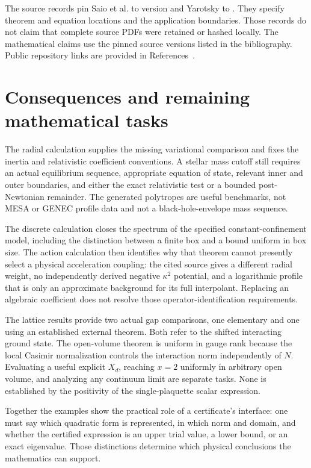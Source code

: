 \documentclass[11pt,letterpaper]{article}
\theoremstyle{definition}
\numberwithin{equation}{section}
\begin{document}
The source records pin Saio et al. to version  and
Yarotsky to . They specify theorem and equation
locations and the application boundaries. Those
records do not claim that complete source PDFs were retained or hashed
locally. The mathematical claims use the pinned source versions listed
in the bibliography. Public repository links are provided in
References~\cite{archive,leanrepo,sources}.

\section{Consequences and remaining mathematical tasks}

The radial calculation supplies the missing variational comparison and
fixes the inertia and relativistic coefficient conventions. A stellar
mass cutoff still requires an actual equilibrium sequence, appropriate
equation of state, relevant inner and outer boundaries, and either the
exact relativistic test or a bounded post-Newtonian remainder. The
generated polytropes are useful benchmarks, not MESA or GENEC profile
data and not a black-hole-envelope mass sequence.

The discrete calculation closes the spectrum of the specified
constant-confinement model, including the distinction between a finite
box and a bound uniform in box size. The action calculation then identifies
why that theorem cannot presently select a physical acceleration
coupling: the cited source gives a different radial weight, no independently
derived negative $\kappa^2$ potential, and a logarithmic profile that is
only an approximate background for its full interpolant. Replacing an
algebraic coefficient does not resolve those operator-identification
requirements.

The lattice results provide two actual gap comparisons, one elementary
and one using an established external theorem. Both refer to the shifted
interacting ground state. The open-volume theorem is uniform in gauge
rank because the local Casimir normalization controls the interaction
norm independently of $N$. Evaluating a useful explicit $X_d$, reaching
$x=2$ uniformly in arbitrary open volume, and analyzing any continuum
limit are separate tasks. None is established by the positivity of the
single-plaquette scalar expression.

Together the examples show the practical role of a certificate's
interface: one must say which quadratic form is represented, in which
norm and domain, and whether the certified expression is an upper trial
value, a lower bound, or an exact eigenvalue. Those distinctions determine
which physical conclusions the mathematics can support.
\end{document}
